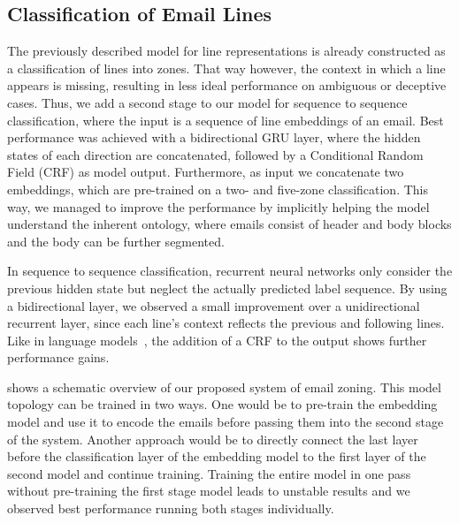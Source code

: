 \documentclass{llncs}
\begin{document}
\subsection{Classification of Email Lines}
The previously described model for line representations is already constructed as a classification of lines into zones.
That way however, the context in which a line appears is missing, resulting in less ideal performance on ambiguous or deceptive cases.
Thus, we add a second stage to our model for sequence to sequence classification, where the input is a sequence of line embeddings of an email.
Best performance was achieved with a bidirectional GRU layer, where the hidden states of each direction are concatenated, followed by a Conditional Random Field (CRF) as model output.
Furthermore, as input we concatenate two embeddings, which are pre-trained on a two- and five-zone classification.
This way, we managed to improve the performance by implicitly helping the model understand the inherent ontology, where emails consist of header and body blocks and the body can be further segmented.

In sequence to sequence classification, recurrent neural networks only consider the previous hidden state but neglect the actually predicted label sequence.
By using a bidirectional layer, we observed a small improvement over a unidirectional recurrent layer, since each line's context reflects the previous and following lines.
Like in language models~\cite{lstm_crf,lstm_cnn_crf}, the addition of a CRF to the output shows further performance gains.

\begin{figure}
\end{figure}

 shows a schematic overview of our proposed system of email zoning.
This model topology can be trained in two ways.
One would be to pre-train the embedding model and use it to encode the emails before passing them into the second stage of the system.
Another approach would be to directly connect the last layer before the classification layer of the embedding model to the first layer of the second model and continue training.
Training the entire model in one pass without pre-training the first stage model leads to unstable results and we observed best performance running both stages individually.
\end{document}
